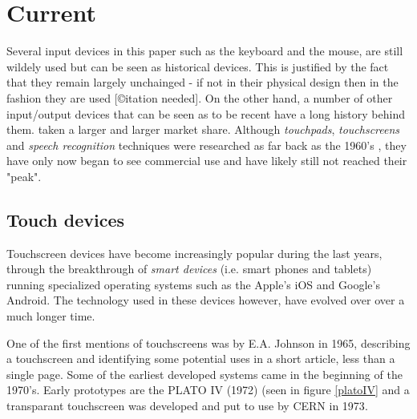 \section{Current}
\label{current}

Several input devices in this paper such as the keyboard and the mouse, are still wildely used but can be seen as historical devices. This is justified by the fact that they remain largely unchainged - if not in their physical design then in the fashion they are used [©itation needed]. On the other hand, a number of other input/output devices that can be seen as to be recent have a long history behind them. taken a larger and larger market share. Although \emph{touchpads}, \emph{touchscreens} and \emph{speech recognition} techniques were researched as far back as the 1960's \cite{buxton}\cite{shoebox}, they have only now began to see commercial use and have likely still not reached their "peak". 


\subsection{Touch devices}
Touchscreen devices have become increasingly popular during the last years, through the breakthrough of \emph{smart devices} (i.e. smart phones and tablets) running specialized operating systems such as the Apple's iOS and Google's Android. The technology used in these devices however, have evolved over over a much longer time.

One of the first mentions of touchscreens was by E.A. Johnson in 1965, describing a touchscreen and identifying some potential uses in a short article, less than a single page\cite{4205802}. Some of the earliest developed systems came in the beginning of the 1970's. Early prototypes are the PLATO IV\cite{buxton} (1972) (seen in figure \ref{platoIV} and a transparant touchscreen was developed and put to use by CERN in 1973\cite{cern}.

